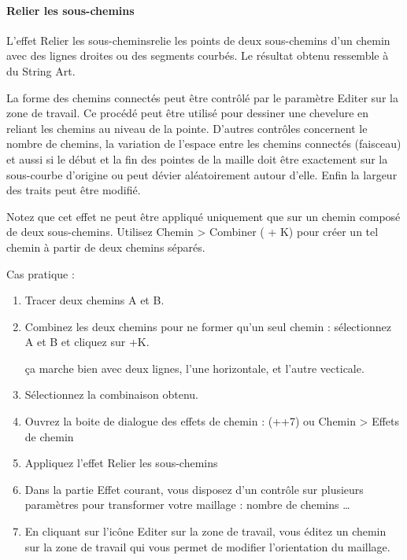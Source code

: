 \documentclass[a4paper,twoside]{article}
\begin{document}
\paragraph{Relier les sous-chemins}


L'effet \og Relier les sous-chemins\fg  relie les points de deux sous-chemins d'un chemin avec des lignes droites ou des segments courbés. Le résultat obtenu ressemble à du \og String Art\fg.

La forme des chemins connectés peut être contrôlé par le paramètre \og Editer sur la zone de travail\fg . Ce procédé peut être utilisé pour dessiner une chevelure en reliant les chemins au niveau de la pointe. D'autres contrôles concernent le nombre de chemins, la variation de l'espace entre les chemins connectés (faisceau) et aussi si le début et la fin des pointes de la maille doit être exactement sur la sous-courbe d'origine ou peut dévier aléatoirement autour d'elle. Enfin la largeur des traits peut être modifié.

Notez que cet effet ne peut être appliqué uniquement que sur un chemin composé de deux sous-chemins. Utilisez Chemin > Combiner ( + K) pour créer un tel chemin à partir de deux chemins séparés.

Cas pratique :
\begin{enumerate}
\item Tracer deux chemins A et B.
\item Combinez les deux chemins pour ne former qu'un seul chemin : sélectionnez A et B et cliquez sur +K.
\begin{exemple}
ça marche bien avec deux lignes, l'une horizontale, et l'autre vecticale.
\end{exemple}
\item Sélectionnez la combinaison obtenu.
\item Ouvrez la boite de dialogue des effets de chemin : (++7) ou Chemin > Effets de chemin
\item Appliquez l'effet \og Relier les sous-chemins\fg
\item Dans la partie \og Effet courant\fg , vous disposez d'un contrôle sur plusieurs paramètres pour transformer votre maillage : nombre de chemins \dots
\item En cliquant sur l'icône \og Editer sur la zone de travail\fg , vous éditez un chemin sur la zone de travail qui vous permet de modifier l'orientation du maillage.
\end{enumerate}
\end{document}
